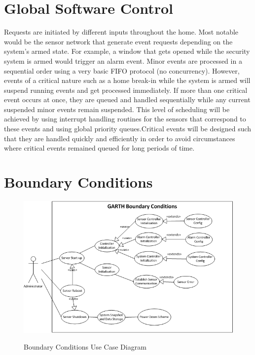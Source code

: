 \documentclass{report}
\begin{document}
\section{Global Software Control}

Requests are initiated by different inputs throughout the home. Most notable
would be the sensor network that generate event requests depending on the
system's armed state. For example, a window that gets opened while the security
system is armed would trigger an alarm event. Minor events are processed in a
sequential order using a very basic FIFO protocol (no concurrency). However,
events of a critical nature such as a home break-in while the system is armed
will suspend running events and get processed immediately. If more than one
critical event occurs at once, they are queued and handled sequentially while
any current suspended minor events remain suspended. This level of scheduling
will be achieved by using interrupt handling routines for the sensors that 
correspond to these events and using global priority queues.Critical events will
be designed such that they are handled quickly and efficiently in order to avoid
circumstances where critical events remained queued for long periods of time.

\section{Boundary Conditions}

\begin{figure}[hp]
    \centering
        \caption{Boundary Conditions Use Case Diagram}
        \scriptsize
        \setlength{\unitlength}{2.0em}
        \includegraphics{boundary_conditions.png}
        \normalsize
    \label{fig:boundary_conditions}
\end{figure}
\end{document}
